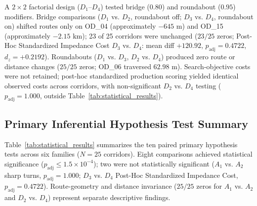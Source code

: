 \documentclass[conference]{IEEEtran}
\begin{document}
A $2 \times 2$ factorial design ($D_1\text{--}D_4$) tested bridge ($0.80$) and roundabout ($0.95$) modifiers. Bridge comparisons ($D_1$ vs. $D_2$, roundabout off; $D_3$ vs. $D_4$, roundabout on) shifted routes only on OD\_04 (approximately $-645\text{ m}$) and OD\_15 (approximately $-2.15\text{ km}$); 23 of 25 corridors were unchanged ($23/25$ zeros; Post-Hoc Standardized Impedance Cost $D_3$ vs. $D_4$: mean diff $+120.92$, $p_{\text{adj}} = 0.4722$, $d_z = +0.2192$). Roundabouts ($D_1$ vs. $D_3$, $D_2$ vs. $D_4$) produced zero route or distance changes ($25/25$ zeros; OD\_06 traversed $62.98\text{ m}$). Search-objective costs were not retained; post-hoc standardized production scoring yielded identical observed costs across corridors, with non-significant $D_2$ vs. $D_4$ testing ($p_{\text{adj}} = 1.000$, outside Table~\ref{tab:statistical_results}).

\subsection{Primary Inferential Hypothesis Test Summary}

Table~\ref{tab:statistical_results} summarizes the ten paired primary hypothesis tests across six families ($N=25$ corridors). Eight comparisons achieved statistical significance ($p_{\text{adj}} \le 1.5 \times 10^{-4}$); two were not statistically significant ($A_1$ vs. $A_2$ sharp turns, $p_{\text{adj}} = 1.000$; $D_3$ vs. $D_4$ Post-Hoc Standardized Impedance Cost, $p_{\text{adj}} = 0.4722$). Route-geometry and distance invariance ($25/25$ zeros for $A_1$ vs. $A_2$ and $D_2$ vs. $D_4$) represent separate descriptive findings.
\end{document}
